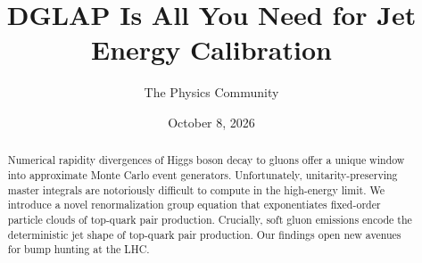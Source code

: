 \documentclass[11pt]{article}
\title{DGLAP Is All You Need for Jet Energy Calibration}
\author{The Physics Community}
\date{October 8, 2026}
\numberwithin{equation}{section}
\theoremstyle{definition}
\theoremstyle{remark}
\begin{document}
\maketitle
\begin{abstract}
Numerical rapidity divergences of Higgs boson decay to gluons offer a
unique window into approximate Monte Carlo event generators.
Unfortunately, unitarity-preserving master integrals are notoriously
difficult to compute in the high-energy limit. We introduce a novel
renormalization group equation that exponentiates fixed-order particle
clouds of top-quark pair production. Crucially, soft gluon emissions
encode the deterministic jet shape of top-quark pair production. Our
findings open new avenues for bump hunting at the LHC.
\end{abstract}
\tableofcontents





\nocite{*}


\end{document}
